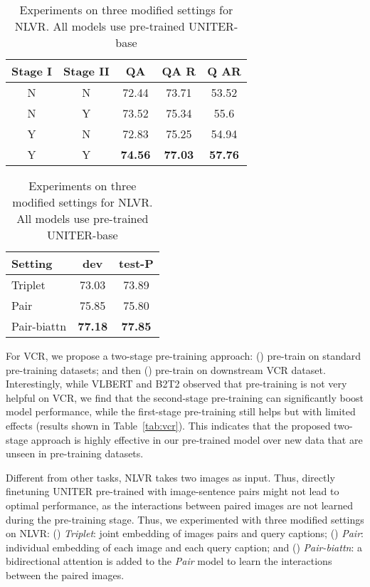 \documentclass[runningheads]{llncs}
\begin{document}
\begin{table}[!t]
\begin{minipage}{.52\linewidth}
    \centering
    \small
\begin{tabular}{c c |c c c}
        \hline
          Stage I & Stage II & QA & QA R & Q  AR \\
         \hline
          N & N & 72.44& 73.71& 53.52\\
          N & Y & 73.52 & 75.34 & 55.6 \\
          \hline
          Y & N & 72.83 & 75.25 & 54.94\\
          Y & Y & \textbf{74.56} & \textbf{77.03} & \textbf{57.76}\\
         \hline
    \end{tabular}
    \caption{\small{Experiments on two-stage pre-training for VCR. Results are from UNITER-base on VCR val split. Stage I and Stage II denote first-stage and second-stage pre-training}}
    \label{tab:vcr}
\end{minipage}\hfill
\begin{minipage}{.42\linewidth}
    \centering
    \small
\begin{tabular}{l c c}
        \hline
         Setting & dev & test-P \\
         \hline
         Triplet & 73.03 & 73.89 \\
         Pair & 75.85 & 75.80 \\
         \hline
         Pair-biattn & \textbf{77.18} & \textbf{77.85}\\
         \hline
    \end{tabular}
\caption{\small{Experiments on three modified settings for NLVR. All models use pre-trained UNITER-base}}
    \label{tab:nlvr2}
\end{minipage}
\end{table} 
For VCR, we propose a two-stage pre-training approach: () pre-train on standard pre-training datasets; and then () pre-train on downstream VCR dataset. 
Interestingly, while VLBERT and B2T2 observed that pre-training is not very helpful on VCR, we find that the second-stage pre-training can significantly boost model performance, while the first-stage pre-training still helps but with limited effects (results shown in Table~\ref{tab:vcr}). This indicates that the proposed two-stage approach is highly effective in our pre-trained model over new data that are unseen in pre-training datasets.


Different from other tasks, NLVR takes two images as input. Thus, directly finetuning UNITER pre-trained with image-sentence pairs might not lead to optimal performance, as the interactions between paired images are not learned during the pre-training stage. Thus, we experimented with three modified settings on NLVR: () \emph{Triplet}: joint embedding of images pairs and query captions; () \emph{Pair}: individual embedding of each image and each query caption; and () \emph{Pair-biattn}: a bidirectional attention is added to the \emph{Pair} model to learn the interactions between the paired images. 
\end{document}
